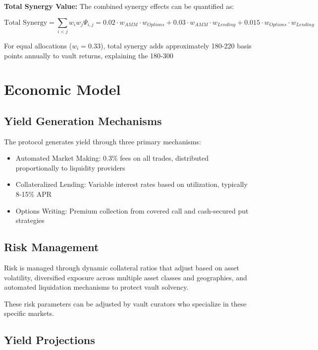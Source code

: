 \documentclass[12pt]{article}
\begin{document}
\textbf{Total Synergy Value:}
The combined synergy effects can be quantified as:

\begin{equation}
\text{Total Synergy} = \sum_{i<j} w_i w_j \Psi_{i,j} = 0.02 \cdot w_{AMM} \cdot w_{Options} + 0.03 \cdot w_{AMM} \cdot w_{Lending} + 0.015 \cdot w_{Options} \cdot w_{Lending}
\end{equation}

For equal allocations ($w_i = 0.33$), total synergy adds approximately 180-220 basis points annually to vault returns, explaining the 180-300%


\section{Economic Model}

\subsection{Yield Generation Mechanisms}

The protocol generates yield through three primary mechanisms:

\begin{itemize}
  \item Automated Market Making: 0.3\% fees on all trades, distributed proportionally to liquidity providers
  \item Collateralized Lending: Variable interest rates based on utilization, typically 8-15\% APR
  \item Options Writing: Premium collection from covered call and cash-secured put strategies
\end{itemize}

\subsection{Risk Management}

Risk is managed through dynamic collateral ratios that adjust based on asset volatility, diversified exposure across multiple asset classes and geographies, and automated liquidation mechanisms to protect vault solvency.

These risk parameters can be adjusted by vault curators who specialize in these specific markets.

\subsection{Yield Projections}
\end{document}
